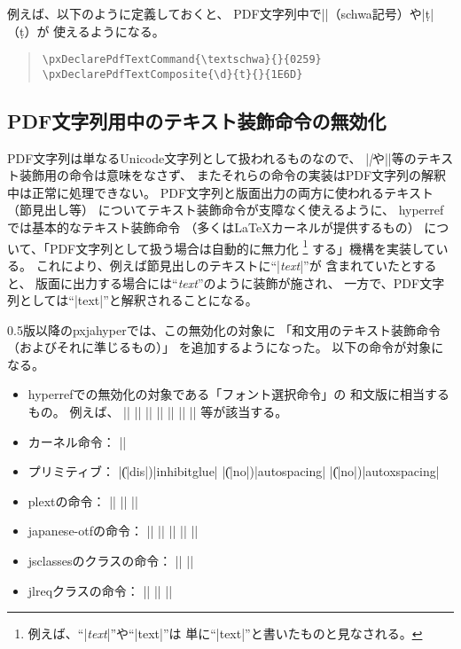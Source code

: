 \documentclass[uplatex,dvipdfmx,a4paper]{jsarticle}
\newcommand{\Pkg}[1]{\textsf{#1}}
\newcommand{\Means}{：\quad}
\begin{document}
例えば、以下のように定義しておくと、
PDF文字列中で|\textschwa|（schwa記号）や|\d{t}|（\d{t}）が
使えるようになる。
\begin{quote}\small\begin{verbatim}
\pxDeclarePdfTextCommand{\textschwa}{}{0259}
\pxDeclarePdfTextComposite{\d}{t}{}{1E6D}
\end{verbatim}\end{quote}

\subsection{PDF文字列用中のテキスト装飾命令の無効化}
\label{ssec:disablecmds}

PDF文字列は単なるUnicode文字列として扱われるものなので、
|\textit|や|\large|等のテキスト装飾用の命令は意味をなさず、
またそれらの命令の実装はPDF文字列の解釈中は正常に処理できない。
PDF文字列と版面出力の両方に使われるテキスト（節見出し等）
についてテキスト装飾命令が支障なく使えるように、
\Pkg{hyperref}では基本的なテキスト装飾命令
（多くは{\LaTeX}カーネルが提供するもの）
について、「PDF文字列として扱う場合は自動的に無力化
\footnote{例えば、“|\textit{text}|”や“|{\large text}|”は
  単に“|text|”と書いたものと見なされる。}
する」機構を実装している。
これにより、例えば節見出しのテキストに“|\textit{text}|”が
含まれていたとすると、
版面に出力する場合には“\textit{text}”のように装飾が施され、
一方で、PDF文字列としては“|text|”と解釈されることになる。

0.5版以降の\Pkg{pxjahyper}では、この無効化の対象に
「和文用のテキスト装飾命令（およびそれに準じるもの）」
を追加するようになった。
以下の命令が対象になる。

\begin{itemize}
\item \Pkg{hyperref}での無効化の対象である「フォント選択命令」の
  和文版に相当するもの。
  例えば、
  |\textmc| |\gtfamily| |\kanjifamily| |\romanshape|
  |\usekanji| |\useroman| |\userelfont|
  等が該当する。
\item {\pLaTeX}カーネル命令\Means
  |\<|
\item {\pTeX}プリミティブ\Means
  |\|(|dis|)|inhibitglue| |\|(|no|)|autospacing| |\|(|no|)|autoxspacing|
\item \Pkg{plext}の命令\Means
  |\bou| |\kasen| |\rensuji|
\item \Pkg{japanese-otf}の命令\Means
  |\textmg| |\mgfamily| |\ltseries| |\ebseries| |\propshape|
\item \Pkg{jsclasses}のクラスの命令\Means
  |\maybeblue| |\HUGE|
\item \Pkg{jlreq}クラスの命令\Means
  |\jafontsize| |\tatechuyoko| |\jidori| %
\end{itemize}
\end{document}
